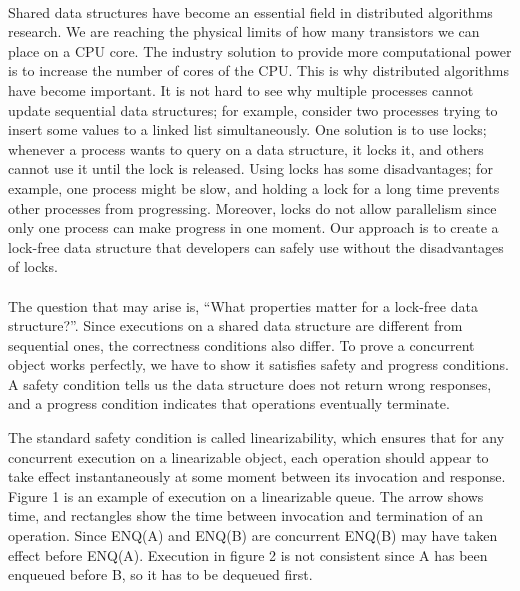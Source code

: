 \documentclass{article}
\begin{document}
\pagebreak

\paragraph{}
Shared data structures have become an essential field in distributed algorithms research.
We are reaching the physical limits of how many transistors we can place on a CPU core. The industry solution to provide more computational power is to increase the number of cores of the CPU. This is why distributed algorithms have become important. It is not hard to see why multiple processes cannot update sequential data structures; for example, consider two processes trying to insert some values to a linked list simultaneously. One solution is to use locks; whenever a process wants to query on a data structure, it locks it, and others cannot use it until the lock is released. Using locks has some disadvantages; for example, one process might be slow, and holding a lock for a long time prevents other processes from progressing. Moreover, locks do not allow parallelism since only one process can make progress in one moment. Our approach is to create a lock-free data structure that developers can safely use without the disadvantages of locks.

\paragraph{}
The question that may arise is, ``What properties matter for a lock-free data structure?''.
Since executions on a shared data structure are different from sequential ones, the correctness conditions also differ. To prove a concurrent object works perfectly, we have to show it satisfies safety and progress conditions. A safety condition tells us the data structure does not return wrong responses, and a progress condition indicates that operations eventually terminate.

The standard safety condition is called linearizability, which ensures that for any concurrent execution on a linearizable object, each operation should appear to take effect instantaneously at some moment between its invocation and response. Figure 1 is an example of execution on a linearizable queue. The arrow shows time, and rectangles show the time between invocation and termination of an operation. Since ENQ(A) and ENQ(B) are concurrent ENQ(B) may have taken effect before ENQ(A). Execution in figure 2 is not consistent since A has been enqueued before B, so it has to be dequeued first.
\end{document}
